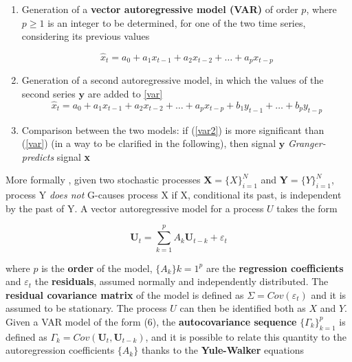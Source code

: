 \documentclass[12pt, a4paper]{report}
\begin{document}
\begin{enumerate}
	
	\item Generation of a \textbf{vector autoregressive model (VAR)} of order $p$, where $p\ge 1$ is an integer to be determined, for one of the two time series, considering its previous values
	
	\begin{equation}
	\hat{x}_t = a_0 + a_1 x_{t-1} + a_2 x_{t-2} + \dots + a_p x_{t-p} \label{var}
	\end{equation}
	
	
	\item Generation of a second autoregressive model, in which the values of the second series $\textbf{y}$ are added  to  \ref{var}
	\begin{equation}
	\hat{x}_t = a_0 + a_1 x_{t-1} + a_2 x_{t-2} + \dots + a_p x_{t-p} + b_1 y_{t-1} + \dots + b_p y_{t-p} \label{var2}
	\end{equation}
	
	
	\item Comparison between the two models: if  (\ref{var2}) is more significant  than  (\ref{var}) (in a way to be clarified in the following), then signal $\textbf{y}$ \textit{Granger-predicts} signal \textbf{x} 
	
\end{enumerate}

More formally \cite{19}, %
given two stochastic processes $ \textbf{X} = \{X\}_{i=1}^N $ and $ \textbf{Y} = \{Y\}_{i=1}^N $, process Y \textit{does not} G-causes process X if X, conditional its past, is independent by the past of Y. A vector autoregressive model for a process $U$ takes the form

\begin{equation}
\textbf{U}_t = \sum_{k=1}^{p} A_k \textbf{U}_{t-k} + \varepsilon_t 
\end{equation}



where $p$ is the \textbf{order} of the model, $\{ A_k\}{k=1}^p$ are the \textbf{regression coefficients} and $\varepsilon_t$ the \textbf{residuals}, assumed normally and independently distributed. The \textbf{ residual covariance matrix} of the model is defined as $ \Sigma = Cov(\varepsilon_t) $ and it is assumed to be stationary. The process $U$ can then be identified both as $X$ and $Y$. Given a VAR model of the form (6), the \textbf{autocovariance sequence} $ \{\Gamma_k\}_{k=1}^p $ is defined as $ \Gamma_k = Cov(\textbf{U}_t,\textbf{U}_{t-k})$, and it is possible to relate this quantity to the autoregression coefficients $\{ A_k\}$ thanks to the \textbf{Yule-Walker} equations \cite{20} %
\end{document}
